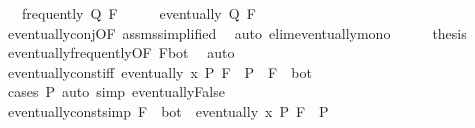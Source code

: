 \begin{isabellebody}
\ \ \ {\isachardoublequoteopen}frequently\ Q\ F{\isachardoublequoteclose}\isanewline
%
\isadelimproof
%
\endisadelimproof
%
\isatagproof
{}\isamarkupfalse%
\ {\isacharminus}{\kern0pt}\isanewline
\ \ \isamarkupfalse%
\ {\isachardoublequoteopen}eventually\ Q\ F{\isachardoublequoteclose}\isanewline
\ \ \ \ \isamarkupfalse%
\ eventually{\isacharunderscore}{\kern0pt}conj{\isacharbrackleft}{\kern0pt}OF\ assms{\isacharparenleft}{\kern0pt}{}{\isacharcomma}{\kern0pt}{}{\isacharparenright}{\kern0pt}{\isacharcomma}{\kern0pt}simplified{\isacharbrackright}{\kern0pt}\ \isamarkupfalse%
\ {\isacharparenleft}{\kern0pt}auto\ elim{\isacharcolon}{\kern0pt}eventually{\isacharunderscore}{\kern0pt}mono{\isacharparenright}{\kern0pt}\isanewline
\ \ \isamarkupfalse%
\ \isamarkupfalse%
\ {\isacharquery}{\kern0pt}thesis\ \isamarkupfalse%
\ eventually{\isacharunderscore}{\kern0pt}frequently{\isacharbrackleft}{\kern0pt}OF\ {\isacartoucheopen}F{\isasymnoteq}bot{\isacartoucheclose}{\isacharbrackright}{\kern0pt}\ \isamarkupfalse%
\ auto\isanewline
{}\isamarkupfalse%
%
\endisatagproof
{\isafoldproof}%
%
\isadelimproof
\isanewline
%
\endisadelimproof
\isanewline
{}\isamarkupfalse%
\ eventually{\isacharunderscore}{\kern0pt}const{\isacharunderscore}{\kern0pt}iff{\isacharcolon}{\kern0pt}\ {\isachardoublequoteopen}eventually\ {\isacharparenleft}{\kern0pt}{\isasymlambda}x{\isachardot}{\kern0pt}\ P{\isacharparenright}{\kern0pt}\ F\ {\isasymlongleftrightarrow}\ P\ {\isasymor}\ F\ {\isacharequal}{\kern0pt}\ bot{\isachardoublequoteclose}\isanewline
%
\isadelimproof
\ \ %
\endisadelimproof
%
\isatagproof
{}\isamarkupfalse%
\ {\isacharparenleft}{\kern0pt}cases\ P{\isacharparenright}{\kern0pt}\ {\isacharparenleft}{\kern0pt}auto\ simp{\isacharcolon}{\kern0pt}\ eventually{\isacharunderscore}{\kern0pt}False{\isacharparenright}{\kern0pt}%
\endisatagproof
{\isafoldproof}%
%
\isadelimproof
\isanewline
%
\endisadelimproof
\isanewline
{}\isamarkupfalse%
\ eventually{\isacharunderscore}{\kern0pt}const{\isacharbrackleft}{\kern0pt}simp{\isacharbrackright}{\kern0pt}{\isacharcolon}{\kern0pt}\ {\isachardoublequoteopen}F\ {\isasymnoteq}\ bot\ {\isasymLongrightarrow}\ eventually\ {\isacharparenleft}{\kern0pt}{\isasymlambda}x{\isachardot}{\kern0pt}\ P{\isacharparenright}{\kern0pt}\ F\ {\isasymlongleftrightarrow}\ P{\isachardoublequoteclose}\isanewline
%
\isadelimproof
\ \ %
\endisadelimproof

\end{isabellebody}
